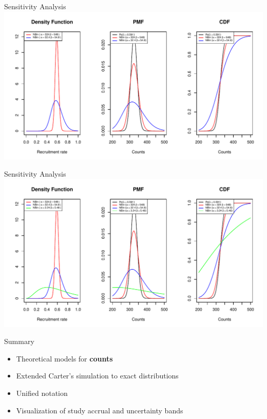 \documentclass[english]{beamer}\usepackage[]{graphicx}\usepackage[]{xcolor}
\makeatletter
\def\maxwidth{ %
  \ifdim\Gin@nat@width>\linewidth
    \linewidth
  \else
    \Gin@nat@width
  \fi
}
\newenvironment{knitrout}{}{} %
\makeatother
\begin{document}
\begin{frame}{Sensitivity Analysis}
\begin{knitrout}
\color{fgcolor}
\includegraphics[width=\maxwidth]{figures/figunnamed-chunk-12-1} 
\end{knitrout}

\end{frame}



\begin{frame}{Sensitivity Analysis}
\begin{knitrout}
\color{fgcolor}
\includegraphics[width=\maxwidth]{figures/figunnamed-chunk-13-1} 
\end{knitrout}

\end{frame}




\begin{frame}{Summary}
\begin{itemize}
\item Theoretical models for \textbf{counts}
\item Extended Carter's simulation to exact distributions
\item Unified notation
\item Visualization of study accrual and uncertainty bands 
\end{itemize}

\end{frame}
\end{document}

